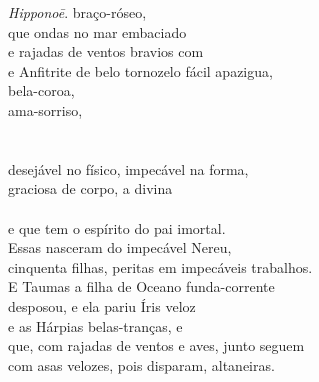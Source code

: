 \begin{pages}
\begin{Rightside}
{{\emph{Hipponoē}.}} braço-róseo,\\
 que ondas no mar embaciado\\
e rajadas de ventos bravios com \\
e Anfitrite de belo tornozelo fácil apazigua,\\
   bela-coroa, \\
 ama-sorriso, \\
  \\
  \\
 desejável no físico, impecável na forma,\\
 graciosa de corpo, a divina  \\
   \\
e  que tem o espírito do pai imortal.\\
Essas nasceram do impecável Nereu,\\
cinquenta filhas, peritas em impecáveis trabalhos.\\

\quad{}E Taumas a filha de Oceano funda-corrente \\
desposou,  e ela pariu Íris veloz\\
e as Hárpias belas-tranças,  e \\
que, com rajadas de ventos e aves, junto seguem\\
com asas velozes, pois disparam, altaneiras.\\


\end{Rightside}
\end{pages}
